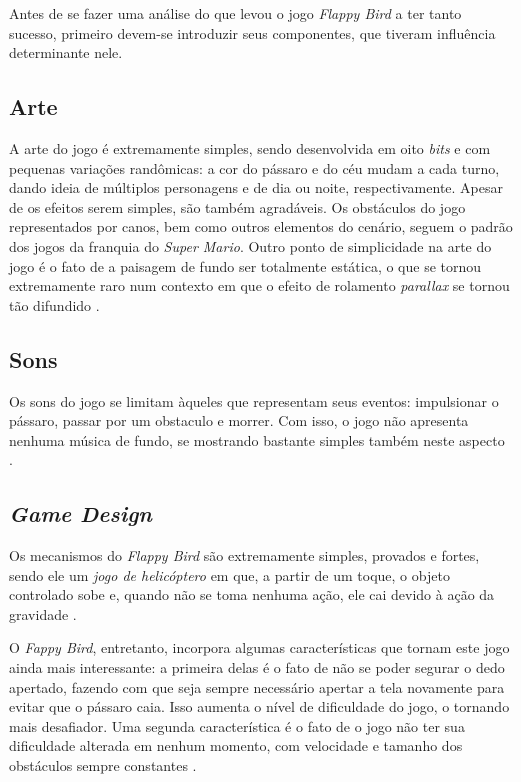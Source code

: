 Antes de se fazer uma análise do que levou o jogo \textit{Flappy Bird} a ter tanto sucesso, primeiro devem-se introduzir seus componentes, que tiveram influência determinante nele.

\subsection{Arte}
A arte do jogo é extremamente simples, sendo desenvolvida em oito \textit{bits} e com pequenas variações randômicas: a cor do pássaro e do céu mudam a cada turno, dando ideia de múltiplos personagens e de dia ou noite, respectivamente. Apesar de os efeitos serem simples, são também agradáveis. Os obstáculos do jogo representados por canos, bem como outros elementos do cenário, seguem o padrão dos jogos da franquia do \textit{Super Mario}. Outro ponto de simplicidade na arte do jogo é o fato de a paisagem de fundo ser totalmente estática, o que se tornou extremamente raro num contexto em que o efeito de rolamento \textit{parallax} se tornou tão difundido \cite{Eldic2014}.

\subsection{Sons}
Os sons do jogo se limitam àqueles que representam seus eventos: impulsionar o pássaro, passar por um obstaculo e morrer. Com isso, o jogo não apresenta nenhuma música de fundo, se mostrando bastante simples também neste aspecto \cite{Eldic2014}.

\subsection{\textit{Game Design}}
Os mecanismos do \textit{Flappy Bird} são extremamente simples, provados e fortes, sendo ele um \textit{jogo de helicóptero} em que, a partir de um toque, o objeto controlado sobe e, quando não se toma nenhuma ação, ele cai devido à ação da gravidade \cite{Eldic2014}.

O \textit{Fappy Bird}, entretanto, incorpora algumas características que tornam este jogo ainda mais interessante: a primeira delas é o fato de não se poder segurar o dedo apertado, fazendo com que seja sempre necessário apertar a tela novamente para evitar que o pássaro caia. Isso aumenta o nível de dificuldade do jogo, o tornando mais desafiador. Uma segunda característica é o fato de o jogo não ter sua dificuldade alterada em nenhum momento, com velocidade e tamanho dos obstáculos sempre constantes \cite{Eldic2014}.

